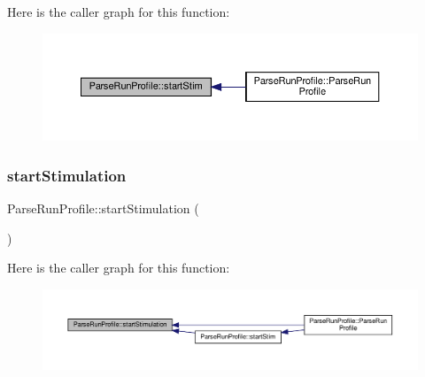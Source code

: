 Here is the caller graph for this function\+:
\nopagebreak
\begin{figure}[H]
\begin{center}
\leavevmode
\includegraphics[width=350pt]{class_parse_run_profile_af1db7c8eb8b8710d98e19b8fd5c41caa_icgraph}
\end{center}
\end{figure}
\mbox{\label{class_parse_run_profile_a633c71cd3f2610c84745c0d70695f45b}} 
\subsubsection{\texorpdfstring{start\+Stimulation}{startStimulation}}
{\footnotesize\ttfamily Parse\+Run\+Profile\+::start\+Stimulation (\begin{DoxyParamCaption}{ }\end{DoxyParamCaption})\hspace{0.3cm}{\ttfamily [signal]}}

Here is the caller graph for this function\+:
\nopagebreak
\begin{figure}[H]
\begin{center}
\leavevmode
\includegraphics[width=350pt]{class_parse_run_profile_a633c71cd3f2610c84745c0d70695f45b_icgraph}
\end{center}
\end{figure}
\mbox{\label{class_parse_run_profile_a4001ee3344847bda70e39cba1c14cd61}} 
